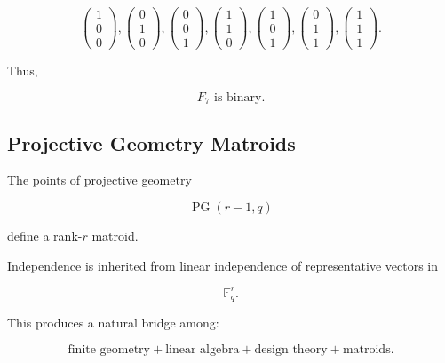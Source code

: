 \[
\begin{pmatrix}
1\\0\\0
\end{pmatrix},
\begin{pmatrix}
0\\1\\0
\end{pmatrix},
\begin{pmatrix}
0\\0\\1
\end{pmatrix},
\begin{pmatrix}
1\\1\\0
\end{pmatrix},
\begin{pmatrix}
1\\0\\1
\end{pmatrix},
\begin{pmatrix}
0\\1\\1
\end{pmatrix},
\begin{pmatrix}
1\\1\\1
\end{pmatrix}.
\]

Thus,

\[
\boxed{
F_7
\text{ is binary}.
}
\]

\subsection{Projective Geometry Matroids}
\label{subsec:projective-geometry-matroids}

The points of projective geometry

\[
\operatorname{PG}(r-1,q)
\]

define a rank-\(r\) matroid.

Independence is inherited from linear independence of representative
vectors in

\[
\mathbb{F}_q^r.
\]

This produces a natural bridge among:

\[
\boxed{
\text{finite geometry}
+
\text{linear algebra}
+
\text{design theory}
+
\text{matroids}.
}
\]

